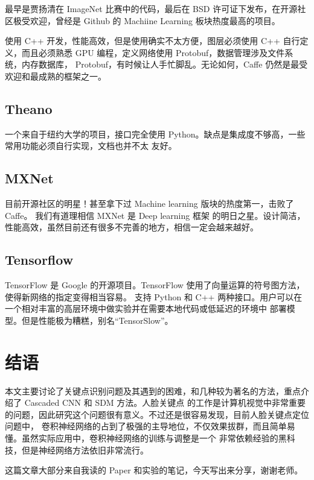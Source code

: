 \documentclass{ctexart}
\begin{document}
最早是贾扬清在 ImageNet 比赛中的代码，最后在 BSD 许可证下发布，在开源社区极受欢迎，曾经是 Github
的 Machiine Learning 板块热度最高的项目。

使用 C++ 开发，性能高效，但是使用确实不太方便，图层必须使用
C++ 自行定义，而且必须熟悉 GPU 编程，定义网络使用 Protobuf，数据管理涉及文件系统，内存数据库，
Protobuf，有时候让人手忙脚乱。无论如何，Caffe 仍然是最受欢迎和最成熟的框架之一。

\subsection{Theano}

一个来自于纽约大学的项目，接口完全使用 Python。缺点是集成度不够高，一些常用功能必须自行实现，文档也并不太
友好。

\subsection{MXNet}

目前开源社区的明星！甚至拿下过 Machine learning 版块的热度第一，击败了 Caffe。
我们有道理相信 MXNet 是 Deep learning 框架
的明日之星。设计简洁，性能高效，虽然目前还有很多不完善的地方，相信一定会越来越好。

\subsection{Tensorflow}
TensorFlow 是 Google 的开源项目。TensorFlow 使用了向量运算的符号图方法，使得新网络的指定变得相当容易。
支持 Python 和 C++ 两种接口。用户可以在一个相对丰富的高层环境中做实验并在需要本地代码或低延迟的环境中
部署模型。但是性能极为糟糕，别名“TensorSlow”。

\section{结语}

本文主要讨论了关键点识别问题及其遇到的困难，和几种较为著名的方法，重点介绍了 Cascaded CNN 和 SDM 方法。人脸关键点
的工作是计算机视觉中非常重要的问题，因此研究这个问题很有意义。不过还是很容易发现，目前人脸关键点定位问题中，
卷积神经网络的占到了极强的主导地位，不仅效果拔群，而且简单易懂。虽然实际应用中，卷积神经网络的训练与调整是一个
非常依赖经验的黑科技，但是神经网络方法依旧非常流行。

这篇文章大部分来自我读的 Paper 和实验的笔记，今天写出来分享，谢谢老师。

\pagebreak

\end{document}
